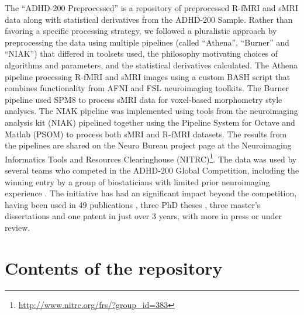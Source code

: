 \documentclass[preprint,12pt,1p]{elsarticle}
\begin{document}
The ``ADHD-200 Preprocessed'' is a repository of preprocessed R-fMRI and sMRI data along with statistical derivatives from the ADHD-200 Sample. Rather than favoring a specific processing strategy, we followed a pluralistic approach by preprocessing the data using multiple pipelines (called ``Athena'', ``Burner'' and ``NIAK'') that differed in toolsets used, the philosophy motivating choices of algorithms and parameters, and the statistical derivatives calculated. The Athena pipeline processing R-fMRI and sMRI images using a custom BASH script that combines functionality from AFNI \cite{Cox1996} and FSL \cite{Smith2004} neuroimaging toolkits. The Burner pipeline used SPM8 \cite{ashburner} to process sMRI data for voxel-based morphometry style analyses. The NIAK pipeline was implemented using tools from the neuroimaging analysis kit (NIAK) \cite{bellecNIAK} pipelined together using the Pipeline System for Octave and Matlab (PSOM) \cite{slcPSOM} to process both sMRI and R-fMRI datasets. The results from the pipelines are shared on the Neuro Bureau project page at the Neuroimaging Informatics Tools and Resources Clearinghouse (NITRC)\footnote{\url{http://www.nitrc.org/frs/?group_id=383}}. The data was used by several teams who competed in the ADHD-200 Global Competition, including the winning entry by a group of biostaticians with limited prior neuroimaging experience \cite{Eloyan2012}. The initiative has had an significant impact beyond the competition, having been used in 49 publications \cite{Rangarajan2014, Liang2012, Tabas2014, Rangarajan2015, Mahanand2013, Lifshitz2012, Fujita2013, Ji2011, Li2015, Li2013, Liu2012, DosSantosSiqueira2014, Olivetti2014, Han2015, Wang2013a, Subramanian2013, Dey2014, Bellec2012, Bohland2012, Chang2012, Cheng2012, Colby2012, Dai2012, Dey2012, Eloyan2012, Olivetti2012, Sato2012a, Carmona2015, Carmona2015a, Hou2015, Deshpande2015, She2014, Lavoie-Courchesne2012b, Chen2015, Nunez-Garcia2015, Solmaz2012, Anderson2014, KadkhodaeianBakhtiari2012, Sato2013, Kyeong2015, Sato2012, Takahashi2012, He2013, Kong2013, Yao2013, Yang2015, Ahn2015, Fujita2014, Reiss2014}, three PhD theses \cite{Colby2012a, Dey2013, Zhang2012}, three master's dissertations \cite{VanGalenLast2011, Vidal2014, Wang2013} and one patent \cite{Dey2013} in just over 3 years, with more in press or under review.

\section{Contents of the repository}
\end{document}

